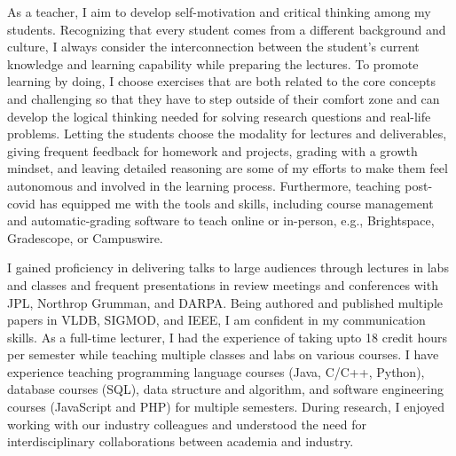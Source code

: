 \documentclass[11pt]{article}
\renewcommand*\paragraph[1]{}
\begin{document}
%
As a teacher, I aim to develop self-motivation and critical thinking among my students. Recognizing that every student comes from a different background and culture, I always consider the interconnection between the student's current knowledge and learning capability while preparing the lectures. To promote learning by doing, I choose exercises that are both related to the core concepts and challenging so that they have to step outside of their comfort zone and can develop the logical thinking needed for solving research questions and real-life problems. Letting the students choose the modality for lectures and deliverables, giving frequent feedback for homework and projects, grading with a growth mindset, and leaving detailed reasoning are some of my efforts to make them feel autonomous and involved in the learning process. 
Furthermore, teaching post-covid has equipped me with the tools and skills, including course management and automatic-grading
software to teach online or in-person, e.g., Brightspace, Gradescope, or Campuswire.

\paragraph{4) Good communication skills.}
I gained proficiency in delivering talks to large audiences through lectures in labs and classes and frequent presentations in review meetings and conferences with JPL, Northrop Grumman, and DARPA. Being authored and published multiple papers in VLDB, SIGMOD, and IEEE, I am confident in my communication skills. As a full-time lecturer, I had the experience of taking upto 18 credit hours per semester while teaching multiple classes and 
labs on various courses. I have experience teaching programming language courses (Java, C/C++, Python), database courses (SQL), data structure and algorithm, and software engineering courses (JavaScript and PHP) for multiple semesters.
During research, I enjoyed working with our industry colleagues and understood the need for interdisciplinary collaborations between academia and industry. 
\end{document}
